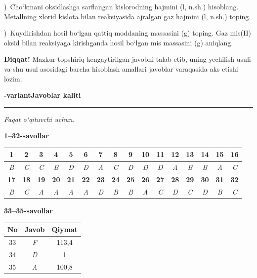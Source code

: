 \documentclass[11pt,a4paper]{article}
\newcommand{\qsep}{\par\vspace{13pt}}
\newcommand{\diqqat}[1]{\par\smallskip\noindent\textbf{Diqqat!} #1\par\medskip}
\begin{document}
)\ Cho`kmani oksidlashga sarflangan kislorodning hajmini (l, n.sh.) hisoblang. Metallning xlorid kislota bilan reaksiyasida ajralgan gaz hajmini (l, n.sh.) toping.\par
{})\ Kuydirishdan hosil bo`lgan qattiq moddaning massasini (g) toping. Gaz mis(II) oksid bilan reaksiyaga kirishganda hosil bo`lgan mis massasini (g) aniqlang.\par
\diqqat{Mazkur topshiriq kengaytirilgan javobni talab etib, uning yechilish usuli va shu usul asosidagi barcha hisoblash amallari javoblar varaqasida aks etishi lozim.}\qsep
\newpage
\noindent\textbf{\fontsize{13}{15}-variant}\hfill \textbf{Javoblar kaliti}\par\smallskip\hrule\smallskip
\textit{Faqat o`qituvchi uchun.}\par\medskip
\noindent\textbf{1--32-savollar}\par\smallskip
\noindent\begin{tabular}{|c|c|c|c|c|c|c|c|c|c|c|c|c|c|c|c|}\hline
\textbf{1} & \textbf{2} & \textbf{3} & \textbf{4} & \textbf{5} & \textbf{6} & \textbf{7} & \textbf{8} & \textbf{9} & \textbf{10} & \textbf{11} & \textbf{12} & \textbf{13} & \textbf{14} & \textbf{15} & \textbf{16}\\\hline
\textsl{B} & \textsl{C} & \textsl{C} & \textsl{B} & \textsl{D} & \textsl{D} & \textsl{A} & \textsl{C} & \textsl{D} & \textsl{D} & \textsl{D} & \textsl{A} & \textsl{B} & \textsl{B} & \textsl{A} & \textsl{C}\\\hline
\textbf{17} & \textbf{18} & \textbf{19} & \textbf{20} & \textbf{21} & \textbf{22} & \textbf{23} & \textbf{24} & \textbf{25} & \textbf{26} & \textbf{27} & \textbf{28} & \textbf{29} & \textbf{30} & \textbf{31} & \textbf{32}\\\hline
\textsl{B} & \textsl{C} & \textsl{A} & \textsl{A} & \textsl{A} & \textsl{A} & \textsl{D} & \textsl{B} & \textsl{B} & \textsl{A} & \textsl{C} & \textsl{D} & \textsl{C} & \textsl{D} & \textsl{B} & \textsl{C}\\\hline
\end{tabular}\par\medskip
\noindent\textbf{33--35-savollar}\par\smallskip
\noindent\begin{tabular}{|c|c|c|}\hline \textbf{No} & \textbf{Javob} & \textbf{Qiymat}\\\hline
33 & \textsl{F} & 113,4\\\hline
34 & \textsl{D} & 1\\\hline
35 & \textsl{A} & 100,8\\\hline
\end{tabular}\par\medskip
\end{document}
